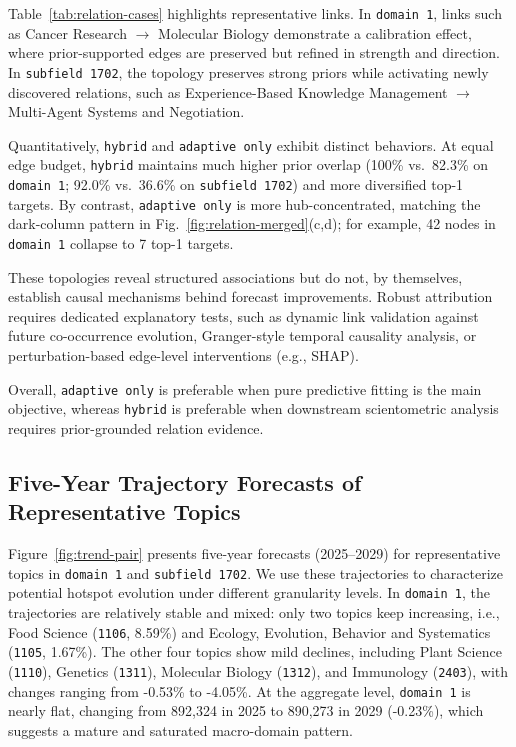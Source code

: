 \documentclass[runningheads]{llncs}
\begin{document}
Table~\ref{tab:relation-cases} highlights representative links. In \texttt{domain 1}, links such as Cancer Research $\rightarrow$ Molecular Biology demonstrate a calibration effect, where prior-supported edges are preserved but refined in strength and direction. In \texttt{subfield 1702}, the topology preserves strong priors while activating newly discovered relations, such as Experience-Based Knowledge Management $\rightarrow$ Multi-Agent Systems and Negotiation.

Quantitatively, \texttt{hybrid} and \texttt{adaptive only} exhibit distinct behaviors. At equal edge budget, \texttt{hybrid} maintains much higher prior overlap (100\% vs.\ 82.3\% on \texttt{domain 1}; 92.0\% vs.\ 36.6\% on \texttt{subfield 1702}) and more diversified top-1 targets. By contrast, \texttt{adaptive only} is more hub-concentrated, matching the dark-column pattern in Fig.~\ref{fig:relation-merged}(c,d); for example, 42 nodes in \texttt{domain 1} collapse to 7 top-1 targets.

These topologies reveal structured associations but do not, by themselves, establish causal mechanisms behind forecast improvements. Robust attribution requires dedicated explanatory tests, such as dynamic link validation against future co-occurrence evolution, Granger-style temporal causality analysis, or perturbation-based edge-level interventions (e.g., SHAP).

Overall, \texttt{adaptive only} is preferable when pure predictive fitting is the main objective, whereas \texttt{hybrid} is preferable when downstream scientometric analysis requires prior-grounded relation evidence.

\subsection{Five-Year Trajectory Forecasts of Representative Topics}
\label{sec:appendix-hotspots}
Figure~\ref{fig:trend-pair} presents five-year forecasts (2025--2029) for representative topics in \texttt{domain 1} and \texttt{subfield 1702}. We use these trajectories to characterize potential hotspot evolution under different granularity levels. In \texttt{domain 1}, the trajectories are relatively stable and mixed: only two topics keep increasing, i.e., Food Science (\texttt{1106}, 8.59\%) and Ecology, Evolution, Behavior and Systematics (\texttt{1105}, 1.67\%). The other four topics show mild declines, including Plant Science (\texttt{1110}), Genetics (\texttt{1311}), Molecular Biology (\texttt{1312}), and Immunology (\texttt{2403}), with changes ranging from -0.53\% to -4.05\%. At the aggregate level, \texttt{domain 1} is nearly flat, changing from 892,324 in 2025 to 890,273 in 2029 (-0.23\%), which suggests a mature and saturated macro-domain pattern.
\end{document}
